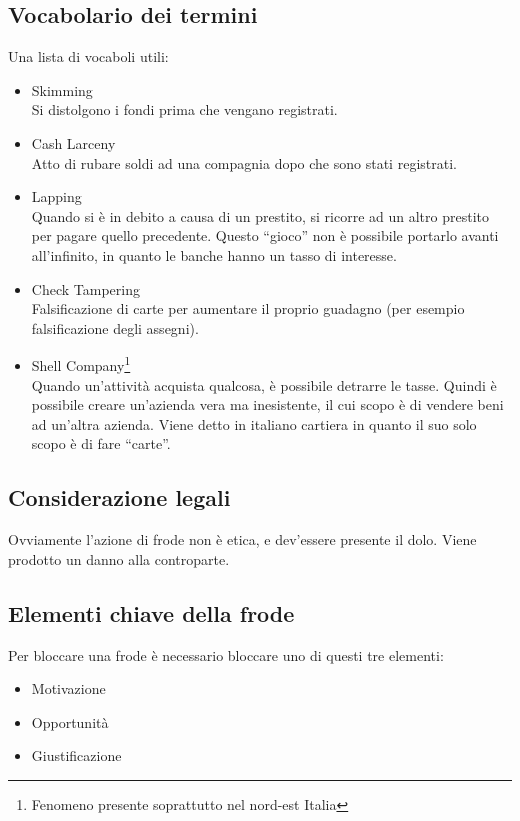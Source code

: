 
\subsection{Vocabolario dei termini}

Una lista di vocaboli utili:
\begin{itemize}
  \item Skimming \\
  Si distolgono i fondi prima che vengano registrati.
  \item Cash Larceny \\
  Atto di rubare soldi ad una compagnia dopo che sono stati registrati.
  \item Lapping \\
  Quando si è in debito a causa di un prestito, si ricorre ad un
  altro prestito per pagare quello precedente. Questo ``gioco'' non è possibile
  portarlo avanti all'infinito, in quanto le banche hanno un tasso di interesse.
  \item Check Tampering \\
  Falsificazione di carte per aumentare il proprio guadagno (per esempio
falsificazione degli assegni).
  \item Shell Company\footnote{Fenomeno presente soprattutto nel nord-est 
  Italia} \\
  Quando un'attività acquista qualcosa, è possibile detrarre le tasse. Quindi è
  possibile creare un'azienda vera ma inesistente, il cui scopo è di vendere
  beni ad un'altra azienda. Viene detto in italiano cartiera in quanto il suo 
  solo scopo è di fare ``carte''.
\end{itemize}

\subsection{Considerazione legali}

Ovviamente l'azione di frode non è etica, e dev'essere presente il dolo. Viene
prodotto un danno alla controparte.

\subsection{Elementi chiave della frode}

Per bloccare una frode è necessario bloccare uno di questi tre elementi:
\begin{itemize}
  \item Motivazione
  \item Opportunità
  \item Giustificazione
\end{itemize}

